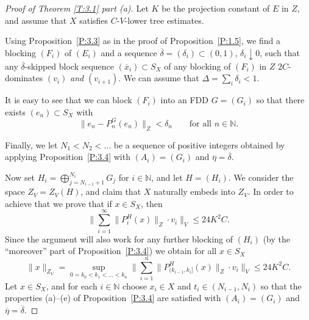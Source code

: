 \documentclass[11pt,leqno]{amsart}
\theoremstyle{definition}
\newcommand{\N}{\mathbb{N}}
\newcommand{\xb}{\overline{x}}
\newcommand{\deltab}{\overline\delta}
\newcommand{\etab}{\overline\eta}
\begin{document}
\begin{proof}[Proof of Theorem \ref{T:3.1} part (a)]
  Let $K$ be the projection constant of $E$ in $Z$, and assume that
  $X$ satisfies $C$-$V$-lower tree estimates.

  Using Proposition~\ref{P:3.3} as in the proof of
  Proposition~\ref{P:1.5}, we find a blocking $(F_i)$ of $(E_i)$ and
  a sequence $\deltab=(\delta_i)\subset (0,1)$, $\delta_i\downarrow 0$,
  such that any $\deltab$-skipped block sequence $(\xb_i)\subset S_X$
  of any blocking of $(F_i)$ in $Z$ $2C$-dominates $(v_i)$ \emph{and}
  $(v_{i+1})$. We can assume that
  $\Delta=\sum_i\delta_i<1$.

  It is easy to see that we can block $(F_i)$ into an FDD $G=(G_i)$ so
  that there exists $(e_n)\subset S_X$ with
  \begin{equation}
    \label{skipped-block}
    \| e_n-P^G_n(e_n)\|_Z<\delta_n\qquad\text{for all }
    n\in\N.
  \end{equation}

  Finally, we let $N_1<N_2<\ldots$ be a sequence of positive integers
  obtained by applying Proposition~\ref{P:3.4} with $(A_i)=(G_i)$ and
  $\etab=\deltab$.

  Now set $H_i=\bigoplus_{j=N_{i-1}+1}^{N_i}G_j$ for $i\in\N$, and let
  $H=(H_i)$. We consider the space $Z_V=Z_V(H)$, and claim that $X$
  naturally embeds into $Z_V$. In order to achieve that we prove that
  if $x\in S_X$, then
  \begin{equation}\label{E:3.1.4}
    \Big\|\sum_{i=1}^\infty \|P_i^H(x)\|_Z \cdot v_i\Big\|_V \leq
    24K^2C.
  \end{equation}
  Since the argument will also work for any further blocking of
  $(H_i)$ (by the ``moreover'' part of Proposition~\ref{P:3.4}) we
  obtain for all $x\in S_X$
  \begin{equation}\label{E:3.1.4a}
    \|x\|_{Z_V}=\sup_{0=k_0<k_1<\ldots<k_n} \Big\|\sum_{i=1}^n
    \|P^H_{(k_{i-1},k_i]}(x)\|_Z \cdot v_i\Big\|_V\leq 24K^2C.
  \end{equation}
  Let $x\in S_X$, and for each $i\in\N$ choose $x_i\in X$ and
  $t_i\in(N_{i-1},N_i)$ so that the properties (a)--(e) of
  Proposition~\ref{P:3.4} are satisfied with $(A_i)=(G_i)$ and 
  $\etab=\deltab$. 


\end{proof}
\end{document}
